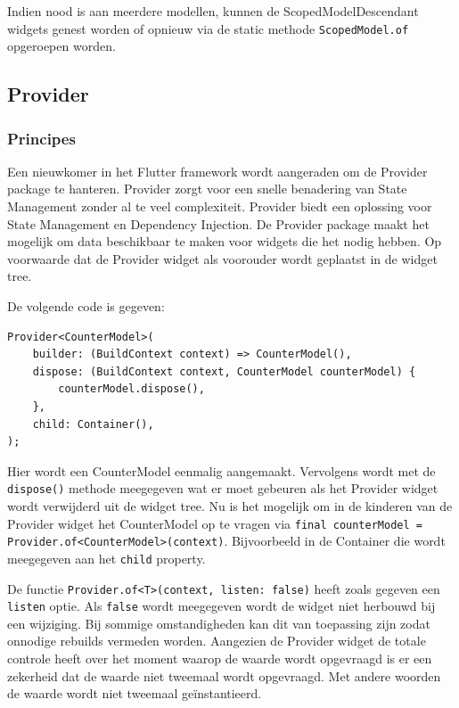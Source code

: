 Indien nood is aan meerdere modellen, kunnen de ScopedModelDescendant widgets genest worden of opnieuw via de static methode \verb|ScopedModel.of| opgeroepen worden.

\subsection{Provider}
\subsubsection{Principes}
Een nieuwkomer in het Flutter framework wordt aangeraden om de Provider package te hanteren. Provider zorgt voor een snelle benadering van State Management zonder al te veel complexiteit. Provider biedt een oplossing voor State Management en Dependency Injection.
De Provider package maakt het mogelijk om data beschikbaar te maken voor widgets die het nodig hebben. Op voorwaarde dat de Provider widget als voorouder wordt geplaatst in de widget tree.

De volgende code is gegeven:
\begin{verbatim}
Provider<CounterModel>(
    builder: (BuildContext context) => CounterModel(),
    dispose: (BuildContext context, CounterModel counterModel) {
        counterModel.dispose(),
    },
    child: Container(),
);
\end{verbatim}

Hier wordt een CounterModel eenmalig aangemaakt. Vervolgens wordt met de \verb|dispose()| methode meegegeven wat er moet gebeuren als het Provider widget wordt verwijderd uit de widget tree. Nu is het mogelijk om in de kinderen van de Provider widget het CounterModel op te vragen via \verb|final counterModel = Provider.of<CounterModel>(context)|.
Bijvoorbeeld in de Container die wordt meegegeven aan het \verb|child| property.

De functie \verb|Provider.of<T>(context, listen: false)| heeft zoals gegeven een \verb|listen| optie. Als \verb|false| wordt meegegeven wordt de widget niet herbouwd bij een wijziging. Bij sommige omstandigheden kan dit van toepassing zijn zodat onnodige rebuilds vermeden worden. Aangezien de Provider widget de totale controle heeft over het moment waarop de waarde wordt opgevraagd is er een zekerheid dat de waarde niet tweemaal wordt opgevraagd. Met andere woorden de waarde wordt niet tweemaal geïnstantieerd.

